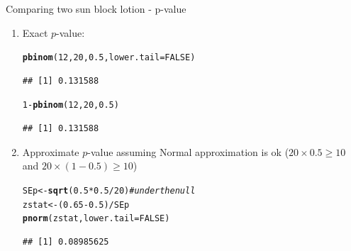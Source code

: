 \documentclass[handout]{beamer}\usepackage[]{graphicx}\usepackage[]{color}
\newcommand{\hlnum}[1]{\textcolor[rgb]{0.686,0.059,0.569}{#1}}%
\newcommand{\hlcom}[1]{\textcolor[rgb]{0.678,0.584,0.686}{\textit{#1}}}%
\newcommand{\hlopt}[1]{\textcolor[rgb]{0,0,0}{#1}}%
\newcommand{\hlstd}[1]{\textcolor[rgb]{0.345,0.345,0.345}{#1}}%
\newcommand{\hlkwb}[1]{\textcolor[rgb]{0.69,0.353,0.396}{#1}}%
\newcommand{\hlkwc}[1]{\textcolor[rgb]{0.333,0.667,0.333}{#1}}%
\newcommand{\hlkwd}[1]{\textcolor[rgb]{0.737,0.353,0.396}{\textbf{#1}}}%
\newenvironment{knitrout}{}{} %
\begin{document}
\begin{frame}[fragile]{Comparing two sun block lotion - p-value}
\small
\begin{enumerate}
	\setlength\itemsep{.51em}
	
	\item Exact $p$-value:
\begin{knitrout}\scriptsize
{}\color{fgcolor}
\begin{alltt}
\hlkwd{pbinom}\hlstd{(}\hlnum{12}\hlstd{,} \hlnum{20}\hlstd{,} \hlnum{0.5}\hlstd{,} \hlkwc{lower.tail} \hlstd{=} \hlnum{FALSE}\hlstd{)}
\end{alltt}
\begin{verbatim}
## [1] 0.131588
\end{verbatim}
\begin{alltt}
\hlnum{1} \hlopt{-} \hlkwd{pbinom}\hlstd{(}\hlnum{12}\hlstd{,} \hlnum{20}\hlstd{,} \hlnum{0.5}\hlstd{)}
\end{alltt}
\begin{verbatim}
## [1] 0.131588
\end{verbatim}

\end{knitrout}
	\pause 

	\item Approximate $p$-value assuming Normal approximation is ok ($20 \times 0.5 \geq 10$ and $20 \times (1-0.5) \geq 10$)
\begin{knitrout}\scriptsize
{}\color{fgcolor}
\begin{alltt}
\hlstd{SEp} \hlkwb{<-} \hlkwd{sqrt}\hlstd{(}\hlnum{0.5}\hlopt{*}\hlnum{0.5}\hlopt{/}\hlnum{20}\hlstd{)} \hlcom{# under the null}
\hlstd{zstat} \hlkwb{<-} \hlstd{(}\hlnum{0.65} \hlopt{-} \hlnum{0.5}\hlstd{)} \hlopt{/} \hlstd{SEp}
\hlkwd{pnorm}\hlstd{(zstat,} \hlkwc{lower.tail} \hlstd{=} \hlnum{FALSE}\hlstd{)}
\end{alltt}
\begin{verbatim}
## [1] 0.08985625
\end{verbatim}

\end{knitrout}
	
	
	
\end{enumerate}

\end{frame}
\end{document}

